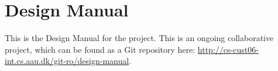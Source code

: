 
\chapter{Design Manual}
\label{app:design_manual}

This is the Design Manual for the \giraf project. This is an ongoing collaborative project, which can be found as a Git repository here: \url{http://cs-cust06-int.cs.aau.dk/git-ro/design-manual}.
